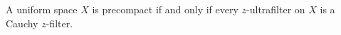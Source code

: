 A uniform space $X$ is precompact if and only if every $z$-ultrafilter on $X$ is a Cauchy $z$-filter.
